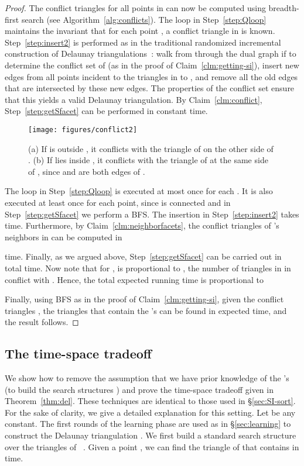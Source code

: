 \documentclass{siamltex}
\begin{document}
\begin{proof}
The conflict triangles for all points in  can now be computed using 
breadth-first search (see Algorithm~\ref{alg:conflicts}). 
The loop in Step~\ref{step:Qloop} maintains the invariant that for each 
point , a conflict triangle  in  is known. 
Step~\ref{step:insert2} is performed as in the traditional randomized
incremental construction of Delaunay 
triangulations~\cite[Chapter~9]{deBergKrOvSc00}: walk from 
through the dual graph if  to determine the conflict set 
of  (as in the proof of Claim~\ref{clm:getting-si}), insert new edges
from all points incident to the triangles in  to , and remove
all the old edges that are intersected by these new edges. The properties
of the conflict set ensure that this yields a valid Delaunay triangulation.
By Claim~\ref{clm:conflict}, Step~\ref{step:getSfacet} can be performed
in constant time.


\begin{figure}[t]
\begin{center}
\texttt{[image: figures/conflict2]}
\end{center}
\caption{(a) If  is outside , it conflicts
with the triangle  of  on the other side of .
(b) If  lies inside , it conflicts with the
triangle  of  at the same side of , since
 and  are both
edges of .}\label{fig:conflict}
\end{figure}

\medskip

The loop in Step~\ref{step:Qloop} is executed at most once for each 
.
It is also executed at least once for each point, since  is 
connected
and in Step~\ref{step:getSfacet} we perform a BFS. The insertion in 
Step~\ref{step:insert2} takes  time. 
Furthermore,
by Claim~\ref{clm:neighborfacets}, the conflict triangles 
of 's neighbors in  can be computed in 

time. Finally, as we argued above, Step~\ref{step:getSfacet} can be carried 
out in total  time. 
Now note that for ,  
is proportional to , the number of triangles in  in conflict 
with . 
Hence, the total expected running time is proportional to

Finally, using BFS as in the proof of Claim~\ref{clm:getting-si}, 
given the conflict triangles , 
the triangles  that contain the 's 
can be found in  expected time, 
and the result follows.
\end{proof}

\subsection{The time-space tradeoff}\label{sec:tradeoff}
We show how to remove the assumption that we have prior knowledge of
the 's (to build the search structures ) and prove
the time-space tradeoff given in Theorem~\ref{thm:del}. These techniques
are identical to those used in \S \ref{sec:SI-sort}.
For the sake of clarity, we give a detailed explanation for this setting.
Let  be any constant. 
The first  rounds of
the learning phase are used as in \S\ref{sec:learning} 
to construct the Delaunay
triangulation . 
We first build a standard search structure
 over the triangles of ~\cite[Chapter~6]{deBergKrOvSc00}. 
Given a point , we can
find the triangle of  that contains  in  time.
\end{document}
